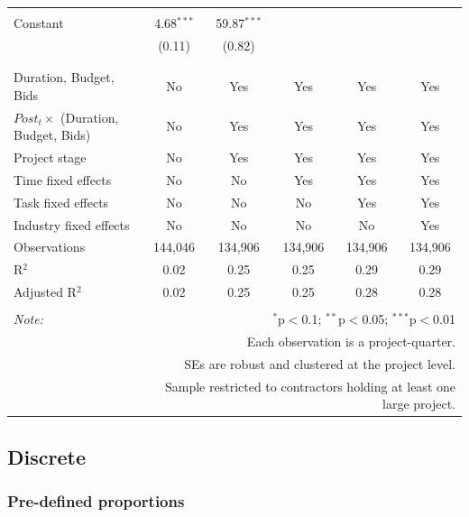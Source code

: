 \documentclass[
]{article}
\begin{document}
\begin{table}[H]
\begin{tabular}{@{\extracolsep{-2pt}}lccccc}
  & & & & & \\ 
 Constant & 4.68$^{***}$ & 59.87$^{***}$ &  &  &  \\ 
  & (0.11) & (0.82) &  &  &  \\ 
  & & & & & \\ 
\hline \\[-1.8ex] 
Duration, Budget, Bids & No & Yes & Yes & Yes & Yes \\ 
$Post_t \times $  (Duration, Budget, Bids) & No & Yes & Yes & Yes & Yes \\ 
Project stage & No & Yes & Yes & Yes & Yes \\ 
Time fixed effects & No & No & Yes & Yes & Yes \\ 
Task fixed effects & No & No & No & Yes & Yes \\ 
Industry fixed effects & No & No & No & No & Yes \\ 
Observations & 144,046 & 134,906 & 134,906 & 134,906 & 134,906 \\ 
R$^{2}$ & 0.02 & 0.25 & 0.25 & 0.29 & 0.29 \\ 
Adjusted R$^{2}$ & 0.02 & 0.25 & 0.25 & 0.28 & 0.28 \\ 
\hline 
\hline \\[-1.8ex] 
\textit{Note:}  & \multicolumn{5}{r}{$^{*}$p$<$0.1; $^{**}$p$<$0.05; $^{***}$p$<$0.01} \\ 
 & \multicolumn{5}{r}{Each observation is a project-quarter.} \\ 
 & \multicolumn{5}{r}{SEs are robust and clustered at the project level.} \\ 
 & \multicolumn{5}{r}{Sample restricted to contractors holding at least one large project.} \\ 
\end{tabular} 
\end{table}

\hypertarget{discrete}{%
\subsection{Discrete}\label{discrete}}

\hypertarget{pre-defined-proportions}{%
\subsubsection{Pre-defined proportions}\label{pre-defined-proportions}}
\end{document}

